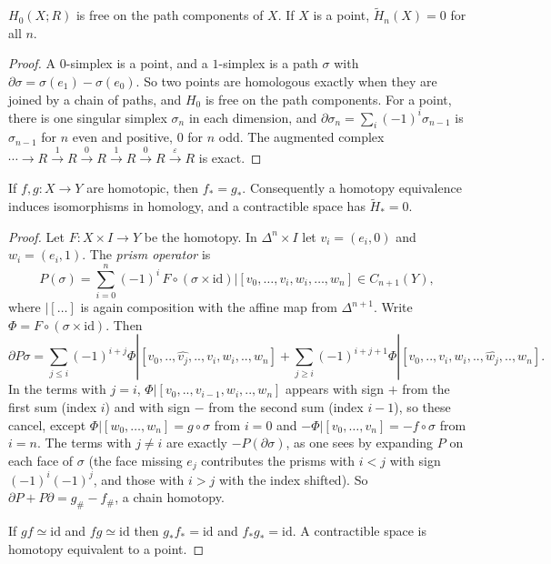 \begin{proposition}\label{prop:H0}
$H_0(X;R)$ is free on the path components of $X$. If $X$ is a point, $\tilde H_n(X)=0$ for all $n$.
\end{proposition}

\begin{proof}
A $0$-simplex is a point, and a $1$-simplex is a path $\sigma$ with $\partial\sigma=\sigma(e_1)-\sigma(e_0)$. So two points are homologous exactly when they are joined by a chain of paths, and $H_0$ is free on
the path components. For a point, there is one singular simplex $\sigma_n$ in each dimension, and $\partial\sigma_n=\sum_i(-1)^i\sigma_{n-1}$ is $\sigma_{n-1}$ for $n$ even and positive, $0$ for $n$ odd. The augmented
complex $\cdots\to R\xrightarrow{1}R\xrightarrow0R\xrightarrow1R\xrightarrow0R\xrightarrow{\varepsilon}R$ is exact.
\end{proof}

\begin{theorem}\label{thm:homotopyH}
If $f,g\colon X\to Y$ are homotopic, then $f_*=g_*$. Consequently a homotopy equivalence induces isomorphisms in homology, and a contractible space has $\tilde H_*=0$.
\end{theorem}

\begin{proof}
Let $F\colon X\times I\to Y$ be the homotopy. In $\Delta^n\times I$ let $v_i=(e_i,0)$ and $w_i=(e_i,1)$. The \emph{prism operator} is
\[P(\sigma)=\sum_{i=0}^n(-1)^i\,F\circ(\sigma\times\mathrm{id})|[v_0,\dots,v_i,w_i,\dots,w_n]\in C_{n+1}(Y),\]
where $|[\dots]$ is again composition with the affine map from $\Delta^{n+1}$. Write $\Phi=F\circ(\sigma\times\mathrm{id})$. Then
\[\partial P\sigma=\sum_{j\le i}(-1)^{i+j}\Phi|[v_0,..,\widehat{v_j},..,v_i,w_i,..,w_n]+\sum_{j\ge i}(-1)^{i+j+1}\Phi|[v_0,..,v_i,w_i,..,\widehat{w_j},..,w_n].\]
In the terms with $j=i$, $\Phi|[v_0,..,v_{i-1},w_i,..,w_n]$ appears with sign $+$ from the first sum (index $i$) and with sign $-$ from the second sum (index $i-1$), so these cancel, except
$\Phi|[w_0,\dots,w_n]=g\circ\sigma$ from $i=0$ and $-\Phi|[v_0,\dots,v_n]=-f\circ\sigma$ from $i=n$. The terms with $j\ne i$ are exactly $-P(\partial\sigma)$, as one sees by expanding $P$ on each face of $\sigma$ (the face
missing $e_j$ contributes the prisms with $i<j$ with sign $(-1)^i(-1)^j$, and those with $i>j$ with the index shifted). So $\partial P+P\partial=g_\#-f_\#$, a chain homotopy.

If $gf\simeq\mathrm{id}$ and $fg\simeq\mathrm{id}$ then $g_*f_*=\mathrm{id}$ and $f_*g_*=\mathrm{id}$. A contractible space is homotopy equivalent to a point.
\end{proof}

